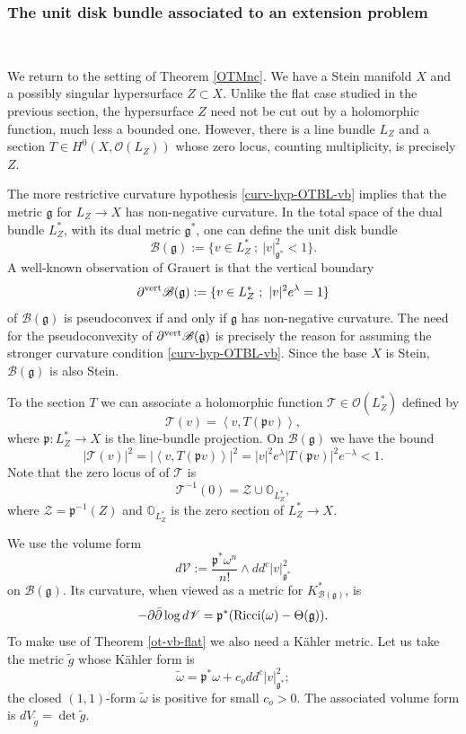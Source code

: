 \documentclass[12pt,hidelinks]{amsart}
\newcommand{\cO}{{\mathcal O}}
\newcommand{\cZ}{{\mathcal Z}}
\newcommand{\sB}{{\mathscr B}}
\newcommand{\sT}{{\mathscr T}}
\newcommand{\sV}{{\mathscr V}}
\newcommand{\fg}{{\mathfrak g}}
\newcommand{\fp}{{\mathfrak p}}
\newcommand{\bbO}{{\mathbb O}}
\newcommand{\di}{\partial}
\newcommand{\dbar}{\bar \partial}
\begin{document}
\subsubsection*{\bf The unit disk bundle associated to an extension problem}\label{disk-bundle-geom}\ 

\medskip

We return to the setting of Theorem \ref{OTMnc}.  We have a Stein manifold $X$ and a possibly singular hypersurface $Z \subset X$.  Unlike the flat case studied in the previous section, the hypersurface $Z$ need not be cut out by a holomorphic function, much less a bounded one.  However, there is a line bundle $L_Z$ and a section $T \in H^0(X, \cO (L_Z))$ whose zero locus, counting multiplicity, is precisely $Z$.  

The more restrictive curvature hypothesis \eqref{curv-hyp-OTBL-vb} implies that the metric $\fg$ for $L_Z \to X$ has non-negative curvature.  In the total space of the dual bundle $L_Z^*$, with its dual metric $\fg ^*$, one can define the unit disk bundle 
\[
\sB (\fg) := \{ v \in L_Z ^*\ ;\ |v|^2_{\fg ^*} < 1 \}.
\]
A well-known observation of Grauert is that the vertical boundary 
\[
\di^{\rm vert}\sB (\fg) := \{ v \in L_Z^*\ ;\ |v|^2e^{\lambda} = 1\}
\]
of $\sB (\fg)$ is pseudoconvex if and only if $\fg$ has non-negative curvature.  The need for the pseudoconvexity of $\di^{\rm vert}\sB (\fg)$ is precisely the reason for assuming the stronger curvature condition \eqref{curv-hyp-OTBL-vb}.  Since the base $X$ is Stein, $\sB (\fg)$ is also Stein.

To the section $T$ we can associate a holomorphic function $\sT \in \cO (L_Z^*)$ defined by 
\[
\sT (v) = \left < v, T(\fp v)\right >,
\]
where $\fp : L_Z ^* \to X$ is the line-bundle projection.  On $\sB (\fg)$ we have the bound 
\[
|\sT (v)|^2 = |\left < v, T(\fp v)\right >|^2 = |v|^2 e^{\lambda} |T(\fp v)|^2e^{-\lambda} < 1.
\]
Note that the zero locus of of $\sT$ is 
\[
\sT^{-1}(0) =\cZ \cup \bbO _{L_Z^*},
\]
where $\cZ = \fp ^{-1} (Z)$ and $\bbO_{L_Z^*}$ is the zero section of $L_Z ^* \to X$.

We use the volume form  
\[
d\sV :=  \frac{\fp ^* \omega ^n}{n!} \wedge dd^c |v|^2_{\fg^*}
\]
on $\sB (\fg)$.  Its curvature, when viewed as a metric for $K_{\sB (\fg)}^*$, is 
\[
- \di \dbar \log d\sV = \fp ^*( {\rm Ricci}(\omega) - \Theta(\fg)).
\]
To make use of Theorem \ref{ot-vb-flat} we also need a K\"ahler metric.  Let us take the metric $\tilde g$ whose K\"ahler form is 
\[
\tilde \omega = \fp ^* \omega + c_o dd^c |v|^2_{\fg^*};
\]
the closed $(1,1)$-form $\tilde \omega$ is positive for small $c_o>0$.  The associated volume form is $dV_{\tilde g} = \det \tilde g$.
\end{document}
